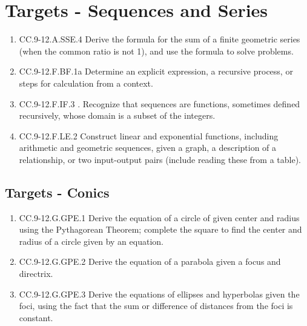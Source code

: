 \documentclass{article}
\begin{document}
\section*{Targets - Sequences and Series}
\begin{enumerate}
	\item CC.9-12.A.SSE.4  Derive the formula for the sum of a finite geometric series (when the common ratio is not 1), and use the formula to solve problems. 
	\item CC.9-12.F.BF.1a Determine an explicit expression, a recursive process, or steps for calculation from a context.
	\item CC.9-12.F.IF.3 . Recognize that sequences are functions, sometimes defined recursively, whose domain is a subset of the integers. 
	\item CC.9-12.F.LE.2  Construct linear and exponential functions, including arithmetic and geometric sequences, given a graph, a description of a relationship, or two input-output pairs (include reading these from a table).
\end{enumerate}
\newpage
\subsection*{Targets - Conics}
\begin{enumerate}
	\item CC.9-12.G.GPE.1 Derive the equation of a circle of given center and radius using the Pythagorean Theorem; complete the square to find the center and radius of a circle given by an equation.
	\item CC.9-12.G.GPE.2 Derive the equation of a parabola given a focus and directrix.
	\item CC.9-12.G.GPE.3 Derive the equations of ellipses and hyperbolas given the foci, using the fact that the sum or difference of distances from the foci is constant.
\end{enumerate}
\end{document}
